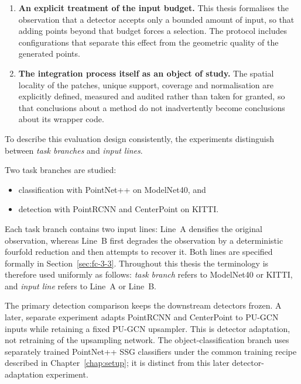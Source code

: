 \begin{enumerate}
    \item \textbf{An explicit treatment of the input budget.} This thesis
    formalises the observation that a detector accepts only a bounded
    amount of input, so that adding points beyond that budget forces a selection. The protocol includes configurations that separate
    this effect from the geometric quality of the generated points.

    \item \textbf{The integration process itself as an object of study.}
    The spatial locality of the patches, unique support, coverage and
    normalisation are explicitly defined, measured and audited rather than
    taken for granted, so that conclusions about a method do not
    inadvertently become conclusions about its wrapper code.
\end{enumerate}

To describe this evaluation design consistently, the experiments
distinguish between \emph{task branches} and \emph{input lines}.

Two task branches are studied:
\begin{itemize}
    \item classification with PointNet++ on ModelNet40, and
    \item detection with PointRCNN and CenterPoint on KITTI.
\end{itemize}

Each task branch contains two input lines: Line~A densifies the original
observation, whereas Line~B first degrades the observation
by a deterministic fourfold reduction and then attempts to recover it. Both
lines are specified formally in Section~\ref{sec:fc-3-3}.
Throughout this thesis the terminology is therefore used uniformly as
follows: \emph{task branch} refers to ModelNet40 or KITTI, and \emph{input
line} refers to Line~A or Line~B.

The primary detection comparison keeps the downstream detectors frozen.
A later, separate experiment adapts PointRCNN and CenterPoint to PU-GCN
inputs while retaining a fixed PU-GCN upsampler. This is detector adaptation,
not retraining of the upsampling network. The object-classification branch
uses separately trained PointNet++ SSG classifiers under the common training
recipe described in Chapter~\ref{chap:setup}; it is distinct from this later
detector-adaptation experiment.

